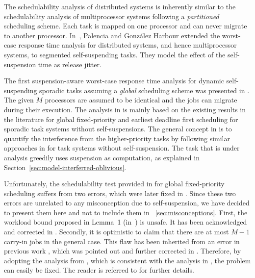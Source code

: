 The schedulability analysis of distributed systems is inherently similar to the schedulability analysis of multiprocessor systems following a 
\emph{partitioned} scheduling scheme. Each task is mapped on one processor and can never migrate to another processor. In~\cite{PH:rtss98}, 
Palencia and Gonz\'alez Harbour extended the worst-case response time analysis for distributed systems, and hence multiprocessor systems, to segmented self-suspending tasks. They model the effect of the self-suspension time as release jitter.
  
The first suspension-aware worst-case response time analysis for dynamic self-suspending sporadic tasks assuming a \emph{global} scheduling scheme was presented in \cite{DBLP:conf/ecrts/LiuA13}. 
The given $M$ processors are assumed to be identical and the jobs can migrate during their execution. The analysis in \cite{DBLP:conf/ecrts/LiuA13} is mainly based on the existing results in the literature for global fixed-priority and earliest deadline first scheduling for sporadic task systems without self-suspensions. The general concept in \cite{DBLP:conf/ecrts/LiuA13} is to quantify the interference from the higher-priority tasks by following similar approaches 
in \cite{baruah2007techniques,DBLP:conf/rtss/GuanSYY09} for task systems without self-suspension. The task that is under analysis greedily uses suspension as computation, as explained in Section~\ref{sec:model-interferred-oblivious}. 

Unfortunately, the schedulability test provided in \cite{DBLP:conf/ecrts/LiuA13} for global fixed-priority scheduling suffers from two errors, which were later fixed in \cite{erratu-cong-anderson}.  Since these two errors are unrelated to any misconception due to self-suspension, we have decided to present them here and not to include them in \mysectionref{}~\ref{sec:misconceptions}.
 First, the workload bound proposed in Lemma~1 (in~\cite{DBLP:conf/ecrts/LiuA13}) is unsafe. It has been acknowledged and corrected in \cite{erratu-cong-anderson}. 
Secondly, it is optimistic to claim that there are at most $M-1$ carry-in jobs in the general case. This flaw has been inherited from an error in  
previous work \cite{DBLP:conf/rtss/GuanSYY09}, which was pointed out and further corrected in \cite{sun2014improving,DBLP:conf/rtns/HuangC15}.  Therefore, by adopting the analysis from \cite{DBLP:conf/rtns/HuangC15}, which is consistent with the analysis in \cite{DBLP:conf/ecrts/LiuA13}, the problem can easily be fixed. The reader is referred to \cite{erratu-cong-anderson} for further details.
 
